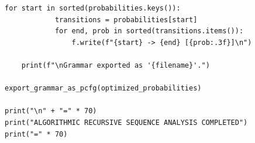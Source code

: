 \documentclass[
  12pt,
  a4paper,
  oneside,
  titlepage
]{article}
\begin{document}
\begin{lstlisting}[caption=Algorithmic Recursive Sequence Analysis 2.0 - Complete Code]
        for start in sorted(probabilities.keys()):
            transitions = probabilities[start]
            for end, prob in sorted(transitions.items()):
                f.write(f"{start} -> {end} [{prob:.3f}]\n")
    
    print(f"\nGrammar exported as '{filename}'.")

export_grammar_as_pcfg(optimized_probabilities)

print("\n" + "=" * 70)
print("ALGORITHMIC RECURSIVE SEQUENCE ANALYSIS COMPLETED")
print("=" * 70)
\end{lstlisting}
\end{document}
